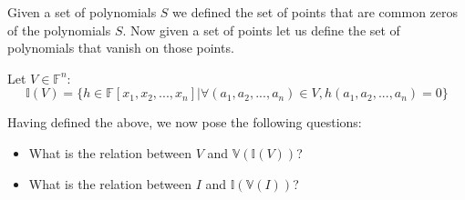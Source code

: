 Given a set of polynomials $S$ we defined the set of points that are common zeros of the polynomials $S$. Now given a set of points let us define the set of polynomials that vanish on those points. 



Let $V \in \mathbb{F}^n$:
\begin{equation}
\mathbb{I}(V) = \{h \in \mathbb{F}[x_1,x_2,...,x_n] | \forall (a_1,a_2,...,a_n) \in V, h(a_1,a_2,...,a_n) = 0 \}
\end{equation}


Having defined the above, we now pose the following questions:
\begin{itemize}
\item What is the relation between $V$ and $\mathbb{V}(\mathbb{I}(V))$?
\item What is the relation between $I$ and $\mathbb{I}(\mathbb{V}(I))$?
\end{itemize}









